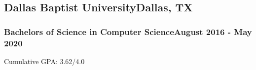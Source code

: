 
\newcommand\education[4]{
	\subsection*{#1\hfill#2}
	\subsubsection*{\normalfont#3\hfill\normalfont#4}
}


\education{Dallas Baptist University}{Dallas, TX}{Bachelors of Science in Computer Science}{August 2016 - May 2020}
Cumulative GPA: 3.62/4.0



